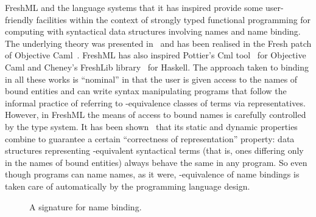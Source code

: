 \documentclass{LMCS}
\theoremstyle{plain}
\theoremstyle{definition}
\begin{document}
FreshML and the language systems that it has inspired provide some
user-friendly facilities within the context of strongly typed
functional programming for computing with syntactical data structures
involving names and name binding.  The underlying theory was presented
in~\cite{PittsAM:metpbn,PittsAM:frepbm} and has been realised in the
Fresh patch of Objective Caml~\cite{ShinwellMR:freona}. FreshML has
also inspired Pottier's Cml tool~\cite{PottierF:ovec} for
Objective Caml and Cheney's FreshLib library~\cite{CheneyJ:scryn} for
Haskell. The approach taken to binding in all these works is
``nominal'' in that the user is given access to the names of bound
entities and can write syntax manipulating programs that follow the
informal practice of referring to -equivalence classes of
terms via representatives.  However, in FreshML the means of access to
bound names is carefully controlled by the type system.  It has been
shown~\cite{ShinwellMR:freafp,PittsAM:monsf} that its static and
dynamic properties combine to guarantee a certain ``correctness of
representation'' property: data structures representing
-equivalent syntactical terms (that is, ones differing only in
the names of bound entities) always behave the same in any program. So
even though programs can name names, as it were, -equivalence
of name bindings is taken care of automatically by the programming
language design.

\begin{figure}
  \centering
  
  \caption{A signature for name binding.}
  \label{fig:signb}
\end{figure}
\end{document}
